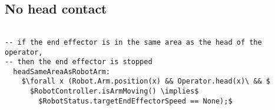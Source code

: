 \subsection{No head contact}

\begin{lstlisting}[fontadjust, mathescape, frame=single]

-- if the end effector is in the same area as the head of the operator, 
-- then the end effector is stopped
  headSameAreaAsRobotArm:
    $\forall x (Robot.Arm.position(x) && Operator.head(x)\ && $
      $RobotController.isArmMoving() \implies$
        $RobotStatus.targetEndEffectorSpeed == None);$

\end{lstlisting}
